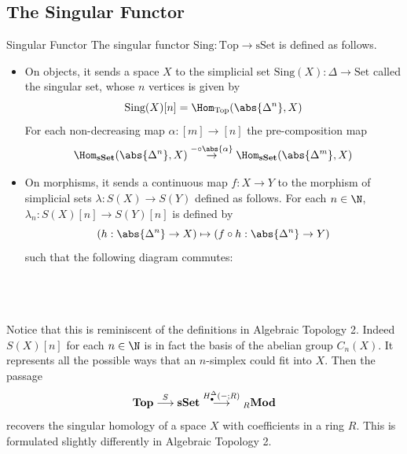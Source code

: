 \documentclass[a4paper]{article}
\begin{document}
\subsection{The Singular Functor}
\begin{defn}{Singular Functor}{} The singular functor $\text{Sing}:\text{Top}\to\text{sSet}$ is defined as follows. 
\begin{itemize}
\item On objects, it sends a space $X$ to the simplicial set $\text{Sing}(X):\Delta\to\text{Set}$ called the singular set, whose $n$ vertices is given by $$\text{Sing}(X)[n]=\Hom_{\text{Top}}(\abs{\Delta^n},X)$$ For each non-decreasing map $\alpha:[m]\to[n]$ the pre-composition map $$\Hom_{\bold{sSet}}(\abs{\Delta^n},X)\overset{-\circ\abs{\alpha}}{\rightarrow}\Hom_{\bold{sSet}}(\abs{\Delta^m},X)$$
\item On morphisms, it sends a continuous map $f:X\to Y$ to the morphism of simplicial sets $\lambda:S(X)\to S(Y)$ defined as follows. For each $n\in\N$, $\lambda_n:S(X)[n]\to S(Y)[n]$ is defined by $$\left(h:\abs{\Delta^n}\to X\right)\mapsto\left(f\circ h:\abs{\Delta^n}\to Y\right)$$ such that the following diagram commutes: \\~\\
\\~\\
\end{itemize}
\end{defn}

Notice that this is reminiscent of the definitions in Algebraic Topology 2. Indeed $S(X)[n]$  for each $n\in\N$ is in fact the basis of the abelian group $C_n(X)$. It represents all the possible ways that an $n$-simplex could fit into $X$. Then the passage $$\bold{Top}\overset{S}{\longrightarrow}\bold{sSet}\overset{H_\bullet^\Delta(-;R)}{\longrightarrow}{_R\bold{Mod}}$$ recovers the singular homology of a space $X$ with coefficients in a ring $R$. This is formulated slightly differently in Algebraic Topology 2. \\~\\
\end{document}

